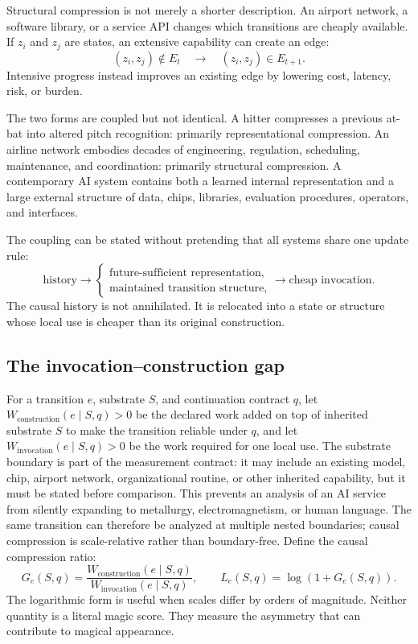 \documentclass[11pt]{article}
\begin{document}
Structural compression is not merely a shorter description. An airport network, a software library, or a service API changes which transitions are cheaply available. If \(z_i\) and \(z_j\) are states, an extensive capability can create an edge:
\[
(z_i,z_j)\notin E_t
\quad\rightarrow\quad
(z_i,z_j)\in E_{t+1}.
\]
Intensive progress instead improves an existing edge by lowering cost, latency, risk, or burden.

The two forms are coupled but not identical. A hitter compresses a previous at-bat into altered pitch recognition: primarily representational compression. An airline network embodies decades of engineering, regulation, scheduling, maintenance, and coordination: primarily structural compression. A contemporary AI system contains both a learned internal representation and a large external structure of data, chips, libraries, evaluation procedures, operators, and interfaces.

The coupling can be stated without pretending that all systems share one update rule:
\[
\text{history}
\rightarrow
\begin{cases}
\text{future-sufficient representation},\\
\text{maintained transition structure},
\end{cases}
\rightarrow\text{cheap invocation}.
\]
The causal history is not annihilated. It is relocated into a state or structure whose local use is cheaper than its original construction.

\subsection{The invocation--construction gap}

For a transition \(e\), substrate \(S\), and continuation contract \(q\), let \(W_{\mathrm{construction}}(e\mid S,q)>0\) be the declared work added on top of inherited substrate \(S\) to make the transition reliable under \(q\), and let \(W_{\mathrm{invocation}}(e\mid S,q)>0\) be the work required for one local use. The substrate boundary is part of the measurement contract: it may include an existing model, chip, airport network, organizational routine, or other inherited capability, but it must be stated before comparison. This prevents an analysis of an AI service from silently expanding to metallurgy, electromagnetism, or human language. The same transition can therefore be analyzed at multiple nested boundaries; causal compression is scale-relative rather than boundary-free. Define the causal compression ratio:
\[
G_e(S,q)=\frac{W_{\mathrm{construction}}(e\mid S,q)}{W_{\mathrm{invocation}}(e\mid S,q)},
\qquad
L_e(S,q)=\log(1+G_e(S,q)).
\]
The logarithmic form is useful when scales differ by orders of magnitude. Neither quantity is a literal magic score. They measure the asymmetry that can contribute to magical appearance.
\end{document}

